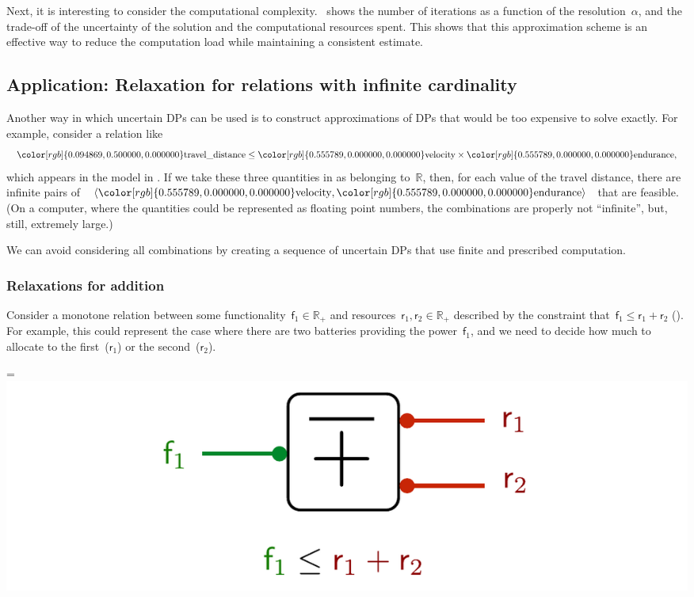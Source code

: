 \documentclass[twocolumn,english]{IEEEconf}
\theoremstyle{plain}
\theoremstyle{definition}
\theoremstyle{definition}
\theoremstyle{plain}
\newcommand{\reals}{\mathbb{R}}
\newcommand{\aword}[1]{\mathsf{#1}}
\newcommand{\vmath}[1]{\aword{#1}}
\newcommand{\fun}{\vmath{f}}
\newcommand{\res}{\vmath{r}}
\newcommand{\colR}{\color[rgb]{0.555789,0.000000,0.000000}}
\newcommand{\colF}{\color[rgb]{0.094869,0.500000,0.000000}}
\newcommand{\F}[1]{{\colF #1}}
\newcommand*{\vcenteredhbox}[1]{\begingroup
\setbox0=\hbox{#1}\parbox{\wd0}{\box0}\endgroup}
\newcommand{\captionsideleft}[2]{
    \medskip
    \begin{minipage}{1.8cm}{
        \hfill
        \protect\captionof{figure}{#1}}\end{minipage}
    \begin{minipage}{6.6cm}
    
    \vcenteredhbox{{#2}}
    \hfill
    \end{minipage}
    \medskip
}
\begin{document}
Next, it is interesting to consider the computational complexity.
~shows the number of iterations as
a function of the resolution~$\alpha$, and the trade-off of the
uncertainty of the solution and the computational resources spent.
This shows that this approximation scheme is an effective way to reduce
the computation load while maintaining a consistent estimate.


\subsection{Application: Relaxation for relations with infinite cardinality\label{sec:Application-relax}}

Another way in which uncertain DPs can be used is to construct approximations
of DPs that would be too expensive to solve exactly. For example,
consider a relation like 
\begin{equation}
{\colF\text{travel\_distance}}\leq{\colR\text{velocity}}\times{\colR\text{endurance}},\label{eq:qun}
\end{equation}
which appears in the model in . If we take
these three quantities in  as belonging to~$\reals$,
then, for each value of the \F{travel distance}, there are infinite
pairs of~$\left\langle {\colR\text{velocity}},{\colR\text{endurance}}\right\rangle $
that are feasible. (On a computer, where the quantities could be represented
as floating point numbers, the combinations are properly not ``infinite'',
but, still, extremely large.)

We can avoid considering all combinations by creating a sequence of
uncertain DPs that use finite and prescribed computation.

\subsubsection{Relaxations for addition}

Consider a monotone relation between some functionality~$\fun_{1}\in\mathbb{R}_{+}$
and resources~$\res_{1},\res_{2}\in\mathbb{R}_{+}$ described by
the constraint that~$\fun_{1}\leq\res_{1}+\res_{2}$ ().
For example, this could represent the case where there are two batteries
providing the power~$\fun_{1}$, and we need to decide how much to
allocate to the first~($\res_{1}$) or the second~($\res_{2}$).

\captionsideleft{\label{fig:example-invplus}}{\includegraphics[scale=0.33]{unc_plusinv}}
\end{document}
